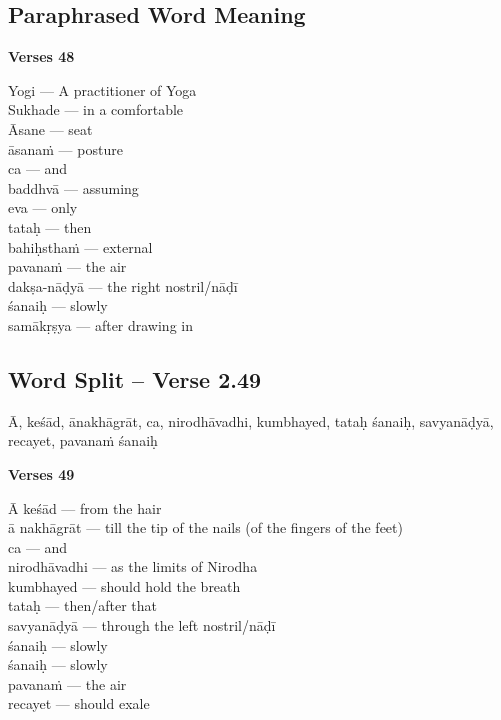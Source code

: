 \subsection*{Paraphrased Word Meaning}


\noindent \textbf{Verses 48}

\begin{multicols}{2}
Yogi --- A practitioner of Yoga \\
Sukhade --- in a comfortable \\
Āsane --- seat \\
āsanaṁ --- posture  \\
ca --- and \\
baddhvā --- assuming\\
eva --- only\\
tataḥ --- then\\ 
bahiḥsthaṁ --- external\\
pavanaṁ --- the air \\
dakṣa-nāḍyā --- the right nostril/nāḍī\\
śanaiḥ --- slowly \\
samākṛṣya --- after drawing in
\end{multicols}

\subsection*{Word Split – Verse 2.49}

Ā, keśād, ānakhāgrāt, ca, nirodhāvadhi, kumbhayed, tataḥ śanaiḥ, savyanāḍyā, recayet, pavanaṁ śanaiḥ
\newpage

\noindent \textbf{Verses 49}

\begin{multicols}{2}
Ā  keśād --- from the hair \\
ā nakhāgrāt --- till the tip of the nails (of the fingers of the feet) \\
ca  --- and \\
nirodhāvadhi --- as the limits of Nirodha \\
kumbhayed --- should hold the breath\\
tataḥ --- then/after that \\
savyanāḍyā --- through the left nostril/nāḍī \\
śanaiḥ --- slowly \\
śanaiḥ --- slowly \\
pavanaṁ --- the air \\
recayet --- should exale 
\end{multicols}

